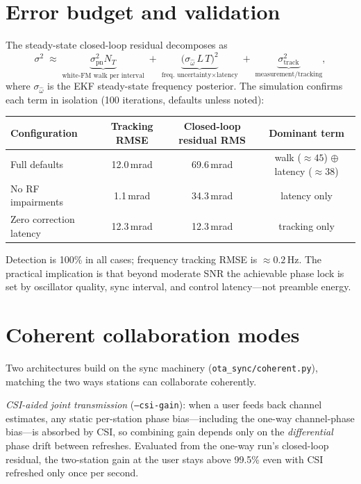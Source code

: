 \documentclass[10pt]{article}
\newcommand{\code}[1]{\texttt{#1}}
\begin{document}
\section{Error budget and validation}
The steady-state closed-loop residual decomposes as
\begin{equation}
\sigma^2 \;\approx\; \underbrace{\sigma_{\mathrm{pn}}^2 N_T}_{\text{white-FM walk per interval}}
\;+\; \underbrace{\big(\sigma_{\hat\omega}\, L\, T\big)^2}_{\text{freq.\ uncertainty} \times \text{latency}}
\;+\; \underbrace{\sigma_{\mathrm{track}}^2}_{\text{measurement/tracking}},
\end{equation}
where $\sigma_{\hat\omega}$ is the EKF steady-state frequency posterior. The
simulation confirms each term in isolation (100 iterations, defaults unless
noted):

\begin{center}
\begin{tabular}{lccc}
\toprule
Configuration & Tracking RMSE & Closed-loop residual RMS & Dominant term \\
\midrule
Full defaults            & 12.0\,mrad & 69.6\,mrad & walk ($\approx45$) $\oplus$ latency ($\approx38$) \\
No RF impairments        & 1.1\,mrad  & 34.3\,mrad & latency only \\
Zero correction latency  & 12.3\,mrad & 12.3\,mrad & tracking only \\
\bottomrule
\end{tabular}
\end{center}

\noindent
Detection is 100\% in all cases; frequency tracking RMSE is
$\approx0.2$\,Hz. The practical implication is that beyond moderate SNR the
achievable phase lock is set by oscillator quality, sync interval, and
control latency---not preamble energy.

\section{Coherent collaboration modes}
Two architectures build on the sync machinery (\code{ota\_sync/coherent.py}),
matching the two ways stations can collaborate coherently.

\emph{CSI-aided joint transmission} (\code{--csi-gain}): when a user feeds
back channel estimates, any static per-station phase bias---including the
one-way channel-phase bias---is absorbed by CSI, so combining gain depends
only on the \emph{differential} phase drift between refreshes. Evaluated from
the one-way run's closed-loop residual, the two-station gain at the user
stays above 99.5\% even with CSI refreshed only once per second.
\end{document}
